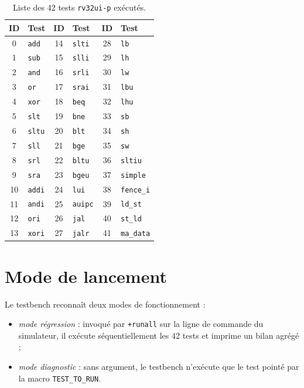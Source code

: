 \documentclass[11pt,a4paper,oneside]{report}
\begin{document}
\begin{table}[H]
\caption{Liste des 42 tests \texttt{rv32ui-p} exécutés.}
\label{tab:tests}
\centering
\small
\begin{tabular}{@{}cl|cl|cl@{}}
\toprule
ID & Test & ID & Test & ID & Test \\
\midrule
0  & \texttt{add}   & 14 & \texttt{slti}  & 28 & \texttt{lb}      \\
1  & \texttt{sub}   & 15 & \texttt{slli}  & 29 & \texttt{lh}      \\
2  & \texttt{and}   & 16 & \texttt{srli}  & 30 & \texttt{lw}      \\
3  & \texttt{or}    & 17 & \texttt{srai}  & 31 & \texttt{lbu}     \\
4  & \texttt{xor}   & 18 & \texttt{beq}   & 32 & \texttt{lhu}     \\
5  & \texttt{slt}   & 19 & \texttt{bne}   & 33 & \texttt{sb}      \\
6  & \texttt{sltu}  & 20 & \texttt{blt}   & 34 & \texttt{sh}      \\
7  & \texttt{sll}   & 21 & \texttt{bge}   & 35 & \texttt{sw}      \\
8  & \texttt{srl}   & 22 & \texttt{bltu}  & 36 & \texttt{sltiu}   \\
9  & \texttt{sra}   & 23 & \texttt{bgeu}  & 37 & \texttt{simple}  \\
10 & \texttt{addi}  & 24 & \texttt{lui}   & 38 & \texttt{fence\_i}\\
11 & \texttt{andi}  & 25 & \texttt{auipc} & 39 & \texttt{ld\_st}  \\
12 & \texttt{ori}   & 26 & \texttt{jal}   & 40 & \texttt{st\_ld}  \\
13 & \texttt{xori}  & 27 & \texttt{jalr}  & 41 & \texttt{ma\_data}\\
\bottomrule
\end{tabular}
\end{table}

\section{Mode de lancement}
Le testbench reconnaît deux modes de fonctionnement :
\begin{itemize}
  \item \emph{mode régression} : invoqué par
        \texttt{+runall} sur la ligne de commande du simulateur,
        il exécute séquentiellement les 42 tests et imprime un
        bilan agrégé ;
  \item \emph{mode diagnostic} : sans argument, le testbench
        n'exécute que le test pointé par la macro
        \texttt{TEST\_TO\_RUN}.
\end{itemize}
\end{document}
